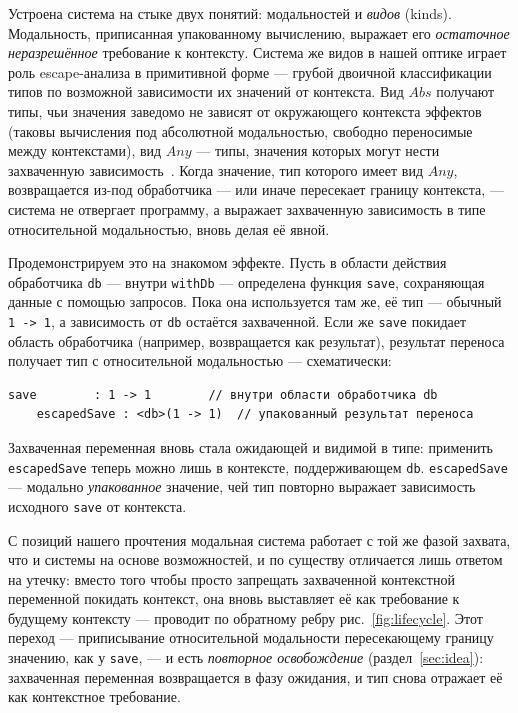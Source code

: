 \documentclass{ProcISPRAS}
\begin{document}
Устроена система на стыке двух понятий: модальностей и \emph{видов} (kinds).
Модальность, приписанная упакованному
вычислению, выражает его \emph{остаточное неразрешённое} требование к контексту.
Система же видов в нашей оптике играет роль escape-анализа в примитивной форме ---
грубой двоичной классификации типов по возможной зависимости их значений от контекста. Вид $Abs$
получают типы, чьи значения заведомо не зависят
от окружающего контекста эффектов (таковы вычисления под абсолютной модальностью,
свободно переносимые между контекстами), вид $Any$ --- типы, значения которых могут
нести захваченную зависимость~\cite{tang2025modal}.
Когда значение, тип которого имеет вид $Any$, возвращается из-под обработчика --- или
иначе пересекает границу контекста, --- система не отвергает программу, а выражает захваченную зависимость в
типе относительной модальностью, вновь делая её явной.

Продемонстрируем это на знакомом эффекте. Пусть в области действия
обработчика \texttt{db} --- внутри \texttt{withDb} --- определена функция
\texttt{save}, сохраняющая данные с помощью запросов.
Пока она используется там же, её тип --- обычный \texttt{1 -> 1}, а зависимость от
\texttt{db} остаётся захваченной. Если же \texttt{save}
покидает область обработчика (например, возвращается как результат), результат переноса
получает тип с относительной модальностью --- схематически:
\begin{lstlisting}[language=modal]
    save        : 1 -> 1        // внутри области обработчика db
    escapedSave : <db>(1 -> 1)  // упакованный результат переноса
\end{lstlisting}
Захваченная переменная вновь стала ожидающей и видимой в типе: применить
\texttt{escapedSave} теперь можно лишь в контексте, поддерживающем \texttt{db}.
\texttt{escapedSave} --- модально \emph{упакованное} значение, чей тип повторно выражает
зависимость исходного \texttt{save} от контекста.

С позиций нашего прочтения модальная система работает с той же фазой захвата, что и
системы на основе возможностей, и по существу отличается лишь ответом на утечку: вместо
того чтобы просто запрещать захваченной контекстной переменной покидать контекст, она
вновь выставляет её как требование к будущему контексту --- проводит по обратному ребру
рис.~\ref{fig:lifecycle}. Этот переход --- приписывание относительной модальности пересекающему границу
значению, как у \texttt{save}, --- и есть \emph{повторное освобождение}
(раздел~\ref{sec:idea}): захваченная переменная возвращается в фазу ожидания, и тип
снова отражает её как контекстное требование.
\end{document}
